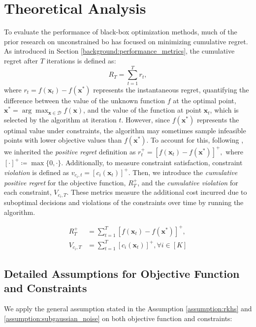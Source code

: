 \section{Theoretical Analysis}
To evaluate the performance of black-box optimization methods, much of the prior research on unconstrained \ac{bo} has focused on minimizing cumulative regret. As introduced in Section \ref{background:performance_metrics}, the cumulative regret after $T$ iterations is defined as:
\[
R_T = \sum_{t=1}^T r_t,  
\] 
where $r_t = f(\mathbf{x}_t) - f(\mathbf{x^*})$  represents the instantaneous regret, quantifying the difference between the value of the unknown function $f$ at the optimal point, $\mathbf{x}^* = \arg\max_{\mathbf{x} \in \mathcal{D}} f(\mathbf{x})$, and the value of the function at point $\mathbf{x}_t$, which is selected by the algorithm at iteration $t$. However, since $f(\mathbf{x^*})$ represents the optimal value under constraints, the algorithm may sometimes sample infeasible points with lower objective values than $f(\mathbf{x^*})$. To account for this, following \citet{xu2023constrained, nguyen2023optimistic}, we inherited the \textit{positive regret} definition as
$r_t^+ = [f(\mathbf{x}_t) - f(\mathbf{x^*})]^+,$
where $[\cdot]^+ \coloneqq \max\{0, \cdot\}$. Additionally, to measure constraint satisfaction, constraint \textit{violation} is defined as $
v_{c_i,t} = [c_i(\mathbf{x}_t)]^+$. 
Then, we introduce the \textit{cumulative positive regret} for the objective function, $R_T^+$, and the \textit{cumulative violation} for each constraint, $V_{c_i, T}$. These metrics measure the additional cost incurred due to suboptimal decisions and violations of the constraints over time by running the algorithm.  
\begin{definition} 
    \begin{align*}
        R_T^+ &=\sum_{t=1}^T [f(\mathbf{x}_t) - f(\mathbf{x^*})]^+,
        \\
        V_{c_i, T}  &= \sum_{t=1}^T [c_i(\mathbf{x}_t)]^+, \forall i \in [K]
    \end{align*}
        
\end{definition}
\subsection{Detailed Assumptions for Objective Function and Constraints}

We apply the general assumption stated in the Assumption \ref{assumption:rkhs} and \ref{assumption:subgaussian_noise} on both objective function and constraints:

